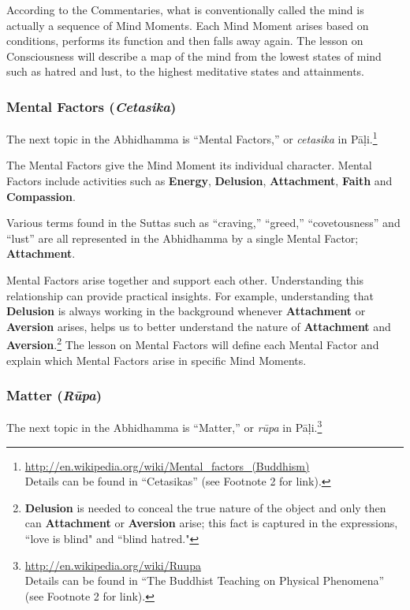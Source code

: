 According to the Commentaries, what is conventionally called the mind is actually a sequence of Mind Moments. Each Mind Moment arises based on conditions, performs its function and then falls away again. The lesson on Consciousness will describe a map of the mind from the lowest states of mind such as hatred and lust, to the highest meditative states and attainments.

\subsubsection*{Mental Factors (\textit{Cetasika})}

The next topic in the Abhidhamma is “Mental Factors,” or \textit{cetasika} in Pāḷi.\footnote{\url{http://en.wikipedia.org/wiki/Mental_factors_(Buddhism)}\\ Details can be found in “Cetasikas” (see Footnote 2 for link).}

The Mental Factors give the Mind Moment its individual character. Mental Factors include activities such as \textbf{Energy}, \textbf{Delusion}, \textbf{Attachment}, \textbf{Faith} and \textbf{Compassion}. 

Various terms found in the Suttas such as “craving,” “greed,” “covetousness” and “lust” are all represented in the Abhidhamma by a single Mental Factor; \textbf{Attachment}. 

Mental Factors arise together and support each other. Understanding this relationship can provide practical insights. For example, understanding that \textbf{Delusion} is always working in the background whenever \textbf{Attachment} or \textbf{Aversion} arises, helps us to better understand the nature of \textbf{Attachment} and \textbf{Aversion}.\footnote{\textbf{Delusion} is needed to conceal the true nature of the object and only then can \textbf{Attachment} or \textbf{Aversion} arise; this fact is captured in the expressions, ``love is blind" and ``blind hatred."} The lesson on Mental Factors will define each Mental Factor and explain which Mental Factors arise in specific Mind Moments.

\pagebreak

\subsubsection*{Matter (\textit{Rūpa})}

The next topic in the Abhidhamma is “Matter,” or \textit{rūpa} in Pāḷi.\footnote{\url{http://en.wikipedia.org/wiki/Ruupa}\\ Details can be found in “The Buddhist Teaching on Physical Phenomena” (see Footnote 2 for link).}

